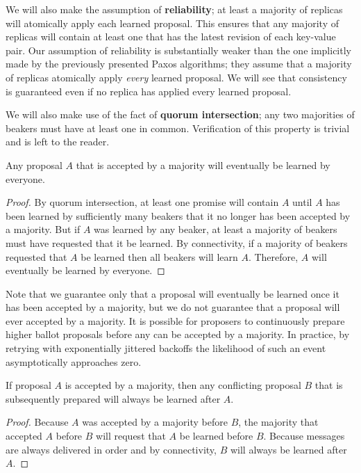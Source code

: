 \documentclass[../main.tex]{subfiles}
\begin{document}
  We will also make the assumption of \textbf{reliability}; at least a majority of replicas will
  atomically apply each learned proposal. This ensures that any majority of replicas will
  contain at least one that has the latest revision of each key-value pair. Our assumption of
  reliability is substantially weaker than the one implicitly made by the previously presented Paxos
  algorithms; they assume that a majority of replicas atomically apply \emph{every} learned
  proposal. We will see that consistency is guaranteed even if no replica has applied every learned
  proposal.

  We will also make use of the fact of \textbf{quorum intersection}; any two majorities of beakers
  must have at least one in common. Verification of this property is trivial and is left to the
  reader. \\

  \begin{theorem}[Liveness]
    Any proposal $A$ that is accepted by a majority will eventually be learned by everyone.
  \end{theorem}
  \begin{proof}
    By quorum intersection, at least one promise will contain $A$ until $A$ has been learned by
    sufficiently many beakers that it no longer has been accepted by a majority. But if $A$ was
    learned by any beaker, at least a majority of beakers must have requested that it be learned.
    By connectivity, if a majority of beakers requested that $A$ be learned then all beakers will
    learn $A$. Therefore, $A$ will eventually be learned by everyone.
  \end{proof}

  Note that we guarantee only that a proposal will eventually be learned once it has been accepted
  by a majority, but we do not guarantee that a proposal will ever accepted by a majority. It is
  possible for proposers to continuously prepare higher ballot proposals before any can be
  accepted by a majority. In practice, by retrying with exponentially jittered backoffs the
  likelihood of such an event asymptotically approaches zero. \\

  \begin{theorem}[Serializability]
    If proposal $A$ is accepted by a majority, then any conflicting proposal $B$ that is
    subsequently prepared will always be learned after $A$.
  \end{theorem}
  \begin{proof}
    Because $A$ was accepted by a majority before $B$, the majority that accepted $A$ before $B$
    will request that $A$ be learned before $B$. Because messages are always delivered in order
    and by connectivity, $B$ will always be learned after $A$.
  \end{proof}
\end{document}
